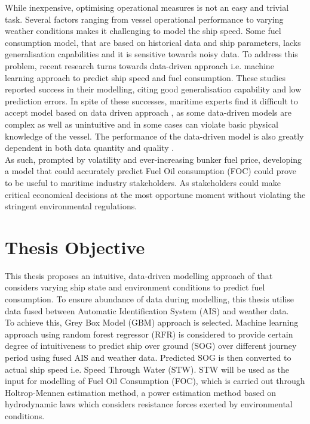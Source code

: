 While inexpensive, optimising operational measures is not an easy and trivial task. Several factors ranging from vessel operational performance to varying weather conditions makes it challenging to model the ship speed. Some fuel consumption model, that are based on historical data and ship parameters, lacks generalisation capabilities and it is sensitive towards noisy data. To address this problem, recent research turns towards data-driven approach i.e. machine learning approach to predict ship speed and fuel consumption. These studies reported success in their modelling, citing good generalisation capability and low prediction errors. In spite of these successes, maritime experts find it difficult to accept model based on data driven approach \cite{Yan.2021}, as some data-driven models are complex as well as unintuitive and in some cases can violate basic physical knowledge of the vessel. The performance of the data-driven model is also greatly dependent in both data quantity and quality \cite{Yan.2021,Gkerekos.2019}.\\      

As such, prompted by volatility and ever-increasing bunker fuel price, developing a model that could accurately predict Fuel Oil consumption (FOC) could prove to be useful to maritime industry stakeholders. As stakeholders could make critical economical decisions at the most opportune moment without violating the stringent environmental regulations. \\

\section{Thesis Objective}\label{sec:objectives}

This thesis proposes an intuitive, data-driven modelling approach of that considers varying ship state and environment conditions to predict fuel consumption. To ensure abundance of data during modelling, this thesis utilise data fused between Automatic Identification System (AIS) and weather data.\\

To achieve this, Grey Box Model (GBM) approach is selected. Machine learning approach using random forest regressor (RFR) is considered to provide certain degree of intuitiveness to predict ship over ground (SOG) over different journey period using fused AIS and weather data. Predicted SOG is then converted to actual ship speed i.e. Speed Through Water (STW). STW will be used as the input for modelling of Fuel Oil Consumption (FOC), which is carried out through Holtrop-Mennen estimation method, a power estimation method based on hydrodynamic laws which considers resistance forces exerted by environmental conditions.\\

